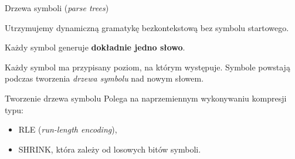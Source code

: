 \documentclass[polish]{beamer}
\begin{document}
\begin{frame}{Drzewa symboli (\textit{parse trees})}
    \begin{alertblock}{}
        Utrzymujemy dynamiczną gramatykę bezkontekstową bez symbolu startowego.
    \end{alertblock}
    \pause
    \begin{block}{}
        Każdy symbol generuje \textbf{dokładnie jedno słowo}.
    \end{block}
    \pause
    \begin{block}{}
        Każdy symbol ma przypisany poziom, na którym występuje. Symbole powstają podczas tworzenia \textit{drzewa symbolu} nad nowym słowem.
    \end{block}
    \pause
    \begin{block}{Tworzenie drzewa symbolu}
        Polega na naprzemiennym wykonywaniu kompresji typu: \pause
        \begin{itemize}
            \item RLE (\textit{run-length encoding}), \pause
            \item SHRINK, która zależy od losowych bitów symboli.
        \end{itemize}
    \end{block}
\end{frame}

\newsavebox{\eighthbox}
\end{document}
